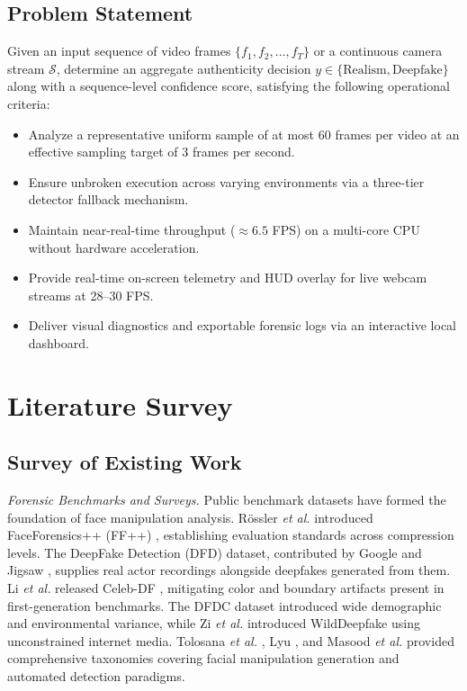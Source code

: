\documentclass[conference]{IEEEtran}
\begin{document}
\subsection{Problem Statement}
Given an input sequence of video frames $\{f_1, f_2, \dots, f_T\}$ or a continuous camera stream $\mathcal{S}$, determine an aggregate authenticity decision $y \in \{\text{Realism}, \text{Deepfake}\}$ along with a sequence-level confidence score, satisfying the following operational criteria:
\begin{itemize}
\item Analyze a representative uniform sample of at most 60 frames per video at an effective sampling target of 3 frames per second.
\item Ensure unbroken execution across varying environments via a three-tier detector fallback mechanism.
\item Maintain near-real-time throughput ($\approx 6.5$ FPS) on a multi-core CPU without hardware acceleration.
\item Provide real-time on-screen telemetry and HUD overlay for live webcam streams at 28--30 FPS.
\item Deliver visual diagnostics and exportable forensic logs via an interactive local dashboard.
\end{itemize}

\section{Literature Survey}

\subsection{Survey of Existing Work}
\textit{Forensic Benchmarks and Surveys.} Public benchmark datasets have formed the foundation of face manipulation analysis. R{\"o}ssler \textit{et al.} introduced FaceForensics++ (FF++) \cite{rossler2019}, establishing evaluation standards across compression levels. The DeepFake Detection (DFD) dataset, contributed by Google and Jigsaw \cite{dufour2019}, supplies real actor recordings alongside deepfakes generated from them. Li \textit{et al.} released Celeb-DF \cite{li2020}, mitigating color and boundary artifacts present in first-generation benchmarks. The DFDC dataset \cite{dolhansky2020} introduced wide demographic and environmental variance, while Zi \textit{et al.} introduced WildDeepfake \cite{zi2020} using unconstrained internet media. Tolosana \textit{et al.} \cite{tolosana2020}, Lyu \cite{lyu2020}, and Masood \textit{et al.} \cite{masood2023} provided comprehensive taxonomies covering facial manipulation generation and automated detection paradigms.
\end{document}
